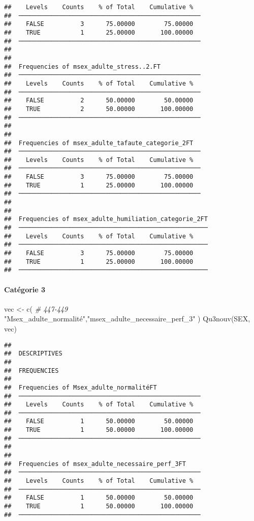 \documentclass[
]{article}
\newenvironment{Shaded}{\begin{snugshade}}{\end{snugshade}}
\newcommand{\CommentTok}[1]{\textcolor[rgb]{0.56,0.35,0.01}{\textit{#1}}}
\newcommand{\FunctionTok}[1]{\textcolor[rgb]{0.00,0.00,0.00}{#1}}
\newcommand{\NormalTok}[1]{#1}
\newcommand{\OtherTok}[1]{\textcolor[rgb]{0.56,0.35,0.01}{#1}}
\newcommand{\StringTok}[1]{\textcolor[rgb]{0.31,0.60,0.02}{#1}}
\begin{document}
\begin{verbatim}
##    Levels    Counts    % of Total    Cumulative %   
##  ────────────────────────────────────────────────── 
##    FALSE          3      75.00000        75.00000   
##    TRUE           1      25.00000       100.00000   
##  ────────────────────────────────────────────────── 
## 
## 
##  Frequencies of msex_adulte_stress..2.FT            
##  ────────────────────────────────────────────────── 
##    Levels    Counts    % of Total    Cumulative %   
##  ────────────────────────────────────────────────── 
##    FALSE          2      50.00000        50.00000   
##    TRUE           2      50.00000       100.00000   
##  ────────────────────────────────────────────────── 
## 
## 
##  Frequencies of msex_adulte_tafaute_categorie_2FT   
##  ────────────────────────────────────────────────── 
##    Levels    Counts    % of Total    Cumulative %   
##  ────────────────────────────────────────────────── 
##    FALSE          3      75.00000        75.00000   
##    TRUE           1      25.00000       100.00000   
##  ────────────────────────────────────────────────── 
## 
## 
##  Frequencies of msex_adulte_humiliation_categorie_2FT 
##  ──────────────────────────────────────────────────── 
##    Levels    Counts    % of Total    Cumulative %   
##  ──────────────────────────────────────────────────── 
##    FALSE          3      75.00000        75.00000   
##    TRUE           1      25.00000       100.00000   
##  ────────────────────────────────────────────────────
\end{verbatim}

\hypertarget{catuxe9gorie-3-4}{%
\paragraph{Catégorie 3}\label{catuxe9gorie-3-4}}

\begin{Shaded}
\begin{Highlighting}[]
\NormalTok{vec }\OtherTok{\textless{}{-}} \FunctionTok{c}\NormalTok{(  }\CommentTok{\# 447{-}449}
  \StringTok{"Msex\_adulte\_normalité"}\NormalTok{,}\StringTok{"msex\_adulte\_necessaire\_perf\_3"}
\NormalTok{)}
\FunctionTok{Qu3nouv}\NormalTok{(SEX, vec)}
\end{Highlighting}
\end{Shaded}

\begin{verbatim}
## 
##  DESCRIPTIVES
## 
##  FREQUENCIES
## 
##  Frequencies of Msex_adulte_normalitéFT             
##  ────────────────────────────────────────────────── 
##    Levels    Counts    % of Total    Cumulative %   
##  ────────────────────────────────────────────────── 
##    FALSE          1      50.00000        50.00000   
##    TRUE           1      50.00000       100.00000   
##  ────────────────────────────────────────────────── 
## 
## 
##  Frequencies of msex_adulte_necessaire_perf_3FT     
##  ────────────────────────────────────────────────── 
##    Levels    Counts    % of Total    Cumulative %   
##  ────────────────────────────────────────────────── 
##    FALSE          1      50.00000        50.00000   
##    TRUE           1      50.00000       100.00000   
##  ──────────────────────────────────────────────────
\end{verbatim}
\end{document}
